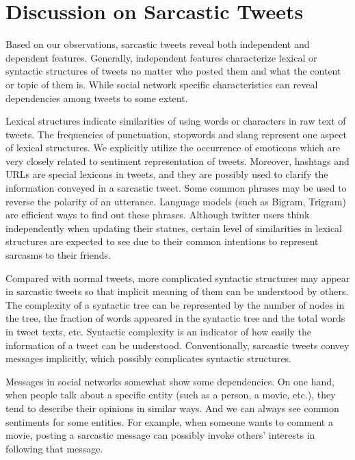 \section{Discussion on Sarcastic Tweets}
\label{sec:dataset}

Based on our observations, sarcastic tweets reveal both independent and dependent features. Generally, independent features characterize lexical or syntactic structures of tweets no matter who posted them and what the content or topic of them is. While social network specific characteristics can reveal dependencies among tweets to some extent.

Lexical structures indicate similarities of using words or characters in raw text of tweets. The frequencies of punctuation, stopwords and slang represent one aspect of lexical structures. We explicitly utilize the occurrence of emoticons which are very closely related to sentiment representation of tweets. Moreover, hashtags and URLs are special lexicons in tweets, and they are possibly used to clarify the information conveyed in a sarcastic tweet. Some common phrases may be used to reverse the polarity of an utterance. Language models (such as Bigram, Trigram) are efficient ways to find out these phrases. Although twitter users think independently when updating their statues, certain level of similarities in lexical structures are expected to see due to their common intentions to represent sarcasms to their friends.

Compared with normal tweets, more complicated syntactic structures may appear in sarcastic tweets so that implicit meaning of them can be understood by others. The complexity of a syntactic tree can be represented by the number of nodes in the tree, the fraction of words appeared in the syntactic tree and the total words in tweet texts, etc. Syntactic complexity is an indicator of how easily the information of a tweet can be understood. Conventionally, sarcastic tweets convey messages implicitly, which possibly complicates syntactic structures.

Messages in social networks somewhat show some dependencies. On one hand, when people talk about a specific entity (such as a person, a movie, etc.), they tend to describe their opinions in similar ways. And we can always see common sentiments for some entities. For example, when someone wants to comment a movie, posting a sarcastic message can possibly invoke others' interests in following that message. 

